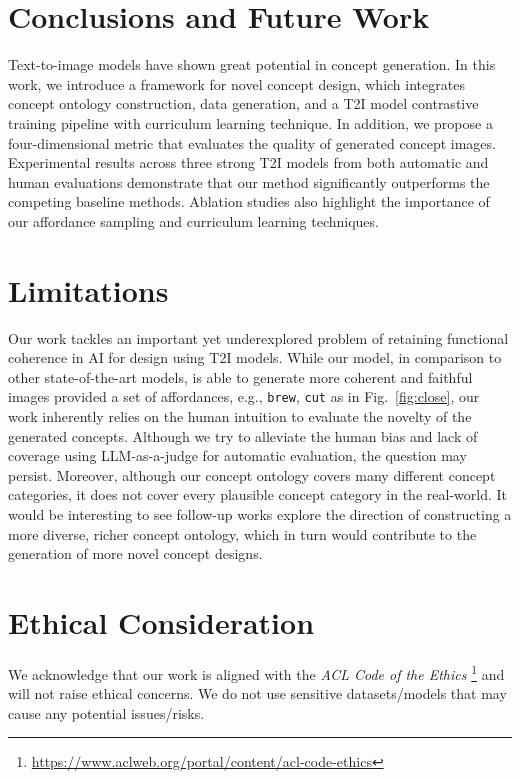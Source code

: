 \section{Conclusions and Future Work}
Text-to-image models have shown great potential in concept generation. In this work, we introduce a framework for novel concept design, which integrates concept ontology construction, data generation, and a T2I model contrastive training pipeline with curriculum learning technique. In addition, we propose a four-dimensional metric that evaluates the quality of generated concept images. Experimental results across three strong T2I models from both automatic and human evaluations demonstrate that our method significantly outperforms the competing baseline methods. Ablation studies also highlight the importance of our affordance sampling and curriculum learning techniques.

\section*{Limitations}
Our work tackles an important yet underexplored problem of retaining functional coherence in AI for design using T2I models. While our model, in comparison to other state-of-the-art models, is able to generate more coherent and faithful images provided a set of affordances, e.g., \texttt{brew}, \texttt{cut} as in Fig.~\ref{fig:close}, our work inherently relies on the human intuition to evaluate the novelty of the generated concepts. Although we try to alleviate the human bias and lack of coverage using LLM-as-a-judge for automatic evaluation, the question may persist. Moreover, although our concept ontology covers many different concept categories, it does not cover every plausible concept category in the real-world. It would be interesting to see follow-up works explore the direction of constructing a more diverse, richer concept ontology, which in turn would contribute to the generation of more novel concept designs.


\section*{Ethical Consideration}
We acknowledge that our work is aligned with the \textit{ACL Code of the Ethics} \footnote{\url{https://www.aclweb.org/portal/content/acl-code-ethics}} and will not raise ethical concerns.
We do not use sensitive datasets/models that may cause any potential issues/risks.


